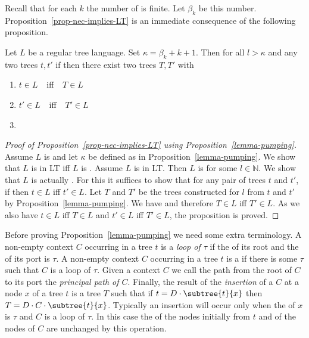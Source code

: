 Recall that for each $k$ the number of \ktypes is finite. Let $\beta_k$ be this
number. Proposition~\ref{prop-nec-implies-LT} is an immediate consequence of
the following proposition.

\begin{prop}\label{lemma-pumping}
  Let $L$ be a \ktame regular tree language. Set $\kappa=\beta_k + k + 1$.
  Then for all $l>\kappa$ and any two trees $t,t'$ if
   then there exist two trees $T,T'$ with
\begin{enumerate}[\em(1)]
\item $t \in L\ $ ~iff~ $\ T \in L$
\item $t' \in L\ $ ~iff~ $\ T' \in L$
\item {}
\end{enumerate}
\end{prop}

\begin{proof}[Proof of Proposition~\ref{prop-nec-implies-LT} using
  Proposition~\ref{lemma-pumping}]
  Assume $L$ is \ktame and let $\kappa$ be defined as in
  Proposition~\ref{lemma-pumping}. We show that $L$ is in LT iff $L$ is
  \testable{\kappa}. Assume $L$ is in LT. Then $L$ is  for some $l
  \in \mathbb{N}$. We show that $L$ is actually \testable{\kappa}. For this it
  suffices to show that for any pair of trees $t$ and $t'$, if
   then $t \in L$ iff $t' \in L$. Let $T$ and $T'$ be
  the trees constructed for $l$ from $t$ and $t'$ by
  Proposition~\ref{lemma-pumping}. We have  and therefore
  $T \in L$ iff $T' \in L$. As we also have $t \in L$ iff $T \in L$ and $t' \in
  L$ iff $T' \in L$, the proposition is proved.
\end{proof}

Before proving Proposition~\ref{lemma-pumping} we need some extra terminology.
A non-empty context $C$ occurring in a tree $t$ is a \emph{loop of \ktype
  $\tau$} if the \ktype of its root and the \ktype of its port is $\tau$. A
non-empty context $C$ occurring in a tree $t$ is a \kloop if there is some
\ktype $\tau$ such that $C$ is a loop of \ktype $\tau$. Given a context $C$ we call the
path from the root of $C$ to its port the \emph{principal path of
  $C$}. Finally, the result of the \emph{insertion} of a \kloop $C$ at a node
$x$ of a tree $t$ is a tree $T$ such that if $t=D \cdot \subtree{t}{x}$ then
$T=D\cdot C \cdot \subtree{t}{x}$. Typically an insertion will occur only when
the \ktype of $x$ is $\tau$ and $C$ is a loop of \ktype $\tau$. In this case
the \ktypes of the nodes initially from $t$ and of the nodes of $C$ are unchanged by this operation.


